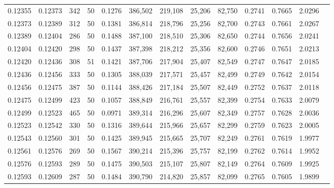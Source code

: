 \begin{tabular}{rrrrrrrrrrrrr}
0.12355 & 0.12373 &   342 &  50 &                                     0.1276 & 386,502 & 219,108 &  25,206 &  82,750 & 0.2741 & 0.7665 & 2.0296 \\
0.12373 & 0.12389 &   312 &  50 &                                     0.1381 & 386,814 & 218,796 &  25,256 &  82,700 & 0.2743 & 0.7661 & 2.0267 \\
0.12389 & 0.12404 &   286 &  50 &                                     0.1488 & 387,100 & 218,510 &  25,306 &  82,650 & 0.2744 & 0.7656 & 2.0241 \\
0.12404 & 0.12420 &   298 &  50 &                                     0.1437 & 387,398 & 218,212 &  25,356 &  82,600 & 0.2746 & 0.7651 & 2.0213 \\
0.12420 & 0.12436 &   308 &  51 &                                     0.1421 & 387,706 & 217,904 &  25,407 &  82,549 & 0.2747 & 0.7647 & 2.0185 \\
0.12436 & 0.12456 &   333 &  50 &                                     0.1305 & 388,039 & 217,571 &  25,457 &  82,499 & 0.2749 & 0.7642 & 2.0154 \\
0.12456 & 0.12475 &   387 &  50 &                                     0.1144 & 388,426 & 217,184 &  25,507 &  82,449 & 0.2752 & 0.7637 & 2.0118 \\
0.12475 & 0.12499 &   423 &  50 &                                     0.1057 & 388,849 & 216,761 &  25,557 &  82,399 & 0.2754 & 0.7633 & 2.0079 \\
0.12499 & 0.12523 &   465 &  50 &                                     0.0971 & 389,314 & 216,296 &  25,607 &  82,349 & 0.2757 & 0.7628 & 2.0036 \\
0.12523 & 0.12542 &   330 &  50 &                                     0.1316 & 389,644 & 215,966 &  25,657 &  82,299 & 0.2759 & 0.7623 & 2.0005 \\
0.12543 & 0.12560 &   301 &  50 &                                     0.1425 & 389,945 & 215,665 &  25,707 &  82,249 & 0.2761 & 0.7619 & 1.9977 \\
0.12561 & 0.12576 &   269 &  50 &                                     0.1567 & 390,214 & 215,396 &  25,757 &  82,199 & 0.2762 & 0.7614 & 1.9952 \\
0.12576 & 0.12593 &   289 &  50 &                                     0.1475 & 390,503 & 215,107 &  25,807 &  82,149 & 0.2764 & 0.7609 & 1.9925 \\
0.12593 & 0.12609 &   287 &  50 &                                     0.1484 & 390,790 & 214,820 &  25,857 &  82,099 & 0.2765 & 0.7605 & 1.9899 \\

\end{tabular}
